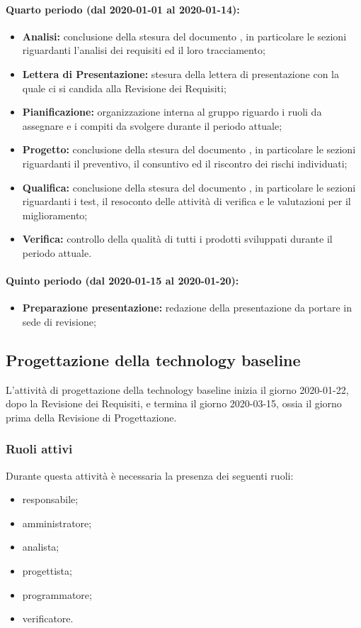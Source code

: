 			\paragraph{Quarto periodo (dal 2020-01-01 al 2020-01-14):}
				\begin{itemize}
					\item \textbf{Analisi:} conclusione della stesura del documento , in particolare le sezioni riguardanti l'analisi dei requisiti ed il loro tracciamento;
					\item \textbf{Lettera di Presentazione:} stesura della lettera di presentazione con la quale ci si candida alla Revisione dei Requisiti;
					\item \textbf{Pianificazione:} organizzazione interna al gruppo riguardo i ruoli da assegnare e i compiti da svolgere durante il periodo attuale;
					\item \textbf{Progetto:} conclusione della stesura del documento , in particolare le sezioni riguardanti il preventivo, il consuntivo ed il riscontro dei rischi individuati;
					\item \textbf{Qualifica:} conclusione della stesura del documento , in particolare le sezioni riguardanti i test, il resoconto delle attività di verifica e le valutazioni per il miglioramento;
					\item \textbf{Verifica:} controllo della qualità di tutti i prodotti sviluppati durante il periodo attuale.
				\end{itemize}
			\paragraph{Quinto periodo (dal 2020-01-15 al 2020-01-20):}
				\begin{itemize}
					\item \textbf{Preparazione presentazione:} redazione della presentazione da portare in sede di revisione;
				\end{itemize}

	\subsection{Progettazione della technology baseline}
		L'attività di progettazione della technology baseline inizia il giorno 2020-01-22, dopo la Revisione dei Requisiti, e termina il giorno 2020-03-15, ossia il giorno prima della Revisione di Progettazione.
		\subsubsection{Ruoli attivi}
			Durante questa attività è necessaria la presenza dei seguenti ruoli:
			\begin{itemize}
				\item responsabile;
				\item amministratore;
				\item analista;
				\item progettista;
				\item programmatore;
				\item verificatore.
			\end{itemize}
